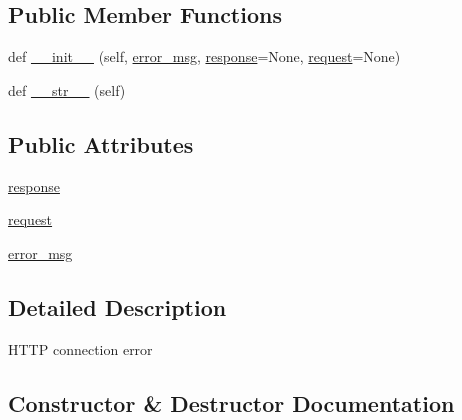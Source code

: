 \subsection*{Public Member Functions}
\begin{DoxyCompactItemize}
\item 
def \hyperlink{classpip_1_1__internal_1_1exceptions_1_1NetworkConnectionError_a2c74d67d3b756bc1a611bcd6180dd4e7}{\+\_\+\+\_\+init\+\_\+\+\_\+} (self, \hyperlink{classpip_1_1__internal_1_1exceptions_1_1NetworkConnectionError_aaab6c8af22684d94fd9cee2fc5bb0f87}{error\+\_\+msg}, \hyperlink{classpip_1_1__internal_1_1exceptions_1_1NetworkConnectionError_a312c55487e6a4e712e25989bb3b7dae6}{response}=None, \hyperlink{classpip_1_1__internal_1_1exceptions_1_1NetworkConnectionError_ad061f70681013a7c604b793d2181ef03}{request}=None)
\item 
def \hyperlink{classpip_1_1__internal_1_1exceptions_1_1NetworkConnectionError_a78060023028e39858870478e5037bef3}{\+\_\+\+\_\+str\+\_\+\+\_\+} (self)
\end{DoxyCompactItemize}
\subsection*{Public Attributes}
\begin{DoxyCompactItemize}
\item 
\hyperlink{classpip_1_1__internal_1_1exceptions_1_1NetworkConnectionError_a312c55487e6a4e712e25989bb3b7dae6}{response}
\item 
\hyperlink{classpip_1_1__internal_1_1exceptions_1_1NetworkConnectionError_ad061f70681013a7c604b793d2181ef03}{request}
\item 
\hyperlink{classpip_1_1__internal_1_1exceptions_1_1NetworkConnectionError_aaab6c8af22684d94fd9cee2fc5bb0f87}{error\+\_\+msg}
\end{DoxyCompactItemize}


\subsection{Detailed Description}
\begin{DoxyVerb}HTTP connection error\end{DoxyVerb}
 

\subsection{Constructor \& Destructor Documentation}
\mbox{\label{classpip_1_1__internal_1_1exceptions_1_1NetworkConnectionError_a2c74d67d3b756bc1a611bcd6180dd4e7}} 
